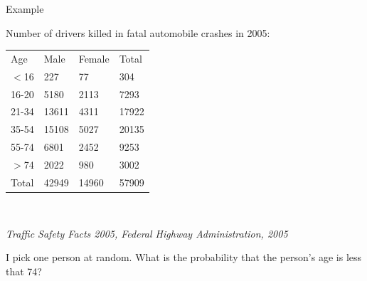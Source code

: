 \begin{frame}{Example}

  Number of drivers killed in fatal automobile crashes in 2005: \\
  \begin{tabular}{llll}
    Age & Male & Female & Total \\
    $<$16 & 227 & 77 & 304 \\
    16-20 & 5180 & 2113 & 7293 \\
    21-34 & 13611 & 4311 & 17922 \\
    35-54 & 15108 & 5027 & 20135 \\
    55-74 & 6801 & 2452 & 9253 \\
    $>$74   & 2022 & 980 & 3002 \\
    Total & 42949 & 14960 & 57909 
  \end{tabular} \\

  \vfill

  \textit{Traffic Safety Facts 2005, Federal Highway Administration,
    2005}

  \vfill

  I pick one person at random. What is the probability that the person's
  age is less that 74?

  
  
\end{frame}



